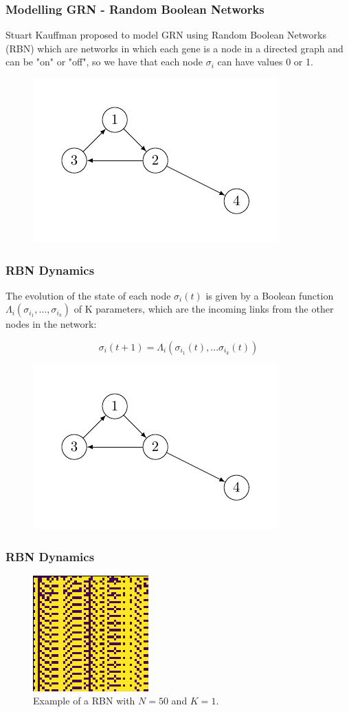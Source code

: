 \documentclass{beamer}
\begin{document}
\begin{frame}
\frametitle{Modelling GRN - Random Boolean Networks}
Stuart Kauffman proposed to model GRN using Random Boolean Networks (RBN)
which are networks in which each gene is a node in a directed graph and can be "on" or "off", so we have that each node $\sigma_i$ can have values 0 or 1.

\begin{figure}
\centering
\includegraphics{figurenetworks2.pdf}
\end{figure}
\end{frame}



\begin{frame}
\frametitle{RBN Dynamics}
The evolution of the state of each node $\sigma_i(t)$ is given by a Boolean function $\Lambda_i(\sigma_{i_1},...,\sigma_{i_k})$ of K parameters, which are the incoming links from the other nodes in the network:


$$
\sigma_i(t+1) = \Lambda_i(\sigma_{i_1}(t),...\sigma_{i_k}(t))
$$
\begin{figure}
\centering
\includegraphics{figurenetworks2.pdf}
\end{figure}
\end{frame}

\begin{frame}
\frametitle{RBN Dynamics}
\begin{figure}
\centering
\includegraphics{rbn.png}
\caption{Example of a RBN with $N=50$ and $K=1$. }
\end{figure}
\end{frame}
\end{document}
